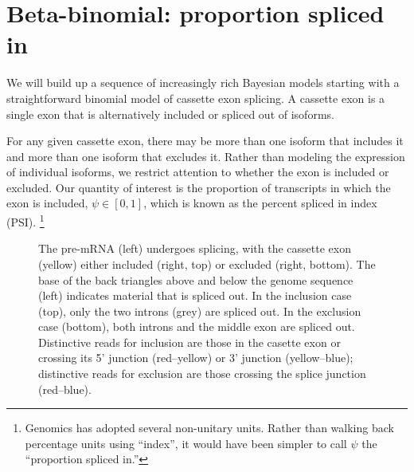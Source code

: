 \documentclass[11pt]{report}
\newcommand{\mycaption}[2]{\caption{#2}\label{#1}}
\begin{document}
\section{Beta-binomial: proportion spliced in}

We will build up a sequence of increasingly rich Bayesian models
starting with a straightforward binomial model of cassette exon
splicing. A cassette exon is a single exon that is alternatively
included or spliced out of isoforms.

For any given cassette exon, there may be more than one isoform that
includes it and more than one isoform that excludes it. Rather than
modeling the expression of individual isoforms, we restrict attention
to whether the exon is included or excluded. Our quantity of interest
is the proportion of transcripts in which the exon is included,
$\psi \in [0, 1]$, which is known as the percent spliced in index
(PSI).%
\footnote{Genomics has adopted several non-unitary units.
  Rather than walking back percentage units using ``index'', it would
  have been simpler to call $\psi$ the ``proportion spliced in.''}

\begin{figure}[t!]
  \centering
  \mycaption{fig:cassette-exon}{The pre-mRNA (left) undergoes
    splicing, with the cassette exon (yellow) either included (right,
    top) or excluded (right, bottom). The base of the back triangles
    above and below the genome sequence (left) indicates material that
    is spliced out. In the inclusion case (top), only the two introns
    (grey) are spliced out.  In the exclusion case (bottom), both
    introns and the middle exon are spliced out. Distinctive reads for
    inclusion are those in the casette exon or crossing its 5'
    junction (red--yellow) or 3' junction (yellow--blue); distinctive
    reads for exclusion are those crossing the splice junction (red--blue).}
\end{figure}
\end{document}
